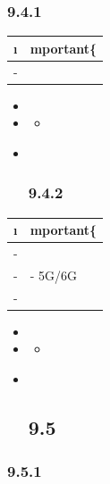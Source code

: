 \hypertarget{section-31}{%
\subsubsection{9.4.1}\label{section-31}}

\begin{longtable}[]{@{}ll@{}}
\toprule\noalign{}
\i & mportant\{} \\
\midrule\noalign{}
\endhead
\bottomrule\noalign{}
\endlastfoot
- & \important{} \\
\end{longtable}

\begin{itemize}
\item
  \important{}
\item
  \begin{itemize}
  \tightlist
  \item
  \end{itemize}
\item ~
  \hypertarget{section-32}{%
  \subsubsection{9.4.2}\label{section-32}}
\end{itemize}

\begin{longtable}[]{@{}ll@{}}
\toprule\noalign{}
\i & mportant\{} \\
\midrule\noalign{}
\endhead
\bottomrule\noalign{}
\endlastfoot
- & \important{} \\
- & - 5G/6G \\
- & \important{} \\
\end{longtable}

\begin{itemize}
\item
  \important{}
\item
  \begin{itemize}
  \tightlist
  \item
  \end{itemize}
\item ~
  \hypertarget{section-33}{%
  \subsection{9.5}\label{section-33}}
\end{itemize}

\hypertarget{section-34}{%
\subsubsection{9.5.1}\label{section-34}}

